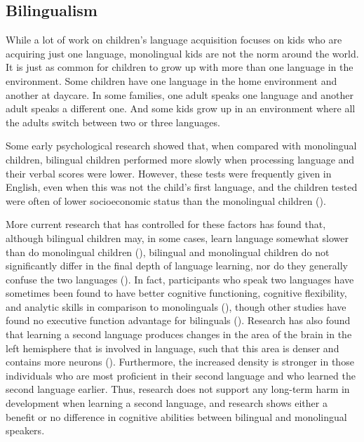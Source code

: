 \documentclass[
]{krantz}
\begin{document}
\subsection*{Bilingualism}\label{bilingualism}


While a lot of work on children's language acquisition focuses on kids who are acquiring just one language, monolingual kids are not the norm around the world. It is just as common for children to grow up with more than one language in the environment. Some children have one language in the home environment and another at daycare. In some families, one adult speaks one language and another adult speaks a different one. And some kids grow up in an environment where all the adults switch between two or three languages.

Some early psychological research showed that, when compared with monolingual children, bilingual children performed more slowly when processing language and their verbal scores were lower. However, these tests were frequently given in English, even when this was not the child's first language, and the children tested were often of lower socioeconomic status than the monolingual children ().

More current research that has controlled for these factors has found that, although bilingual children may, in some cases, learn language somewhat slower than do monolingual children (), bilingual and monolingual children do not significantly differ in the final depth of language learning, nor do they generally confuse the two languages (). In fact, participants who speak two languages have sometimes been found to have better cognitive functioning, cognitive flexibility, and analytic skills in comparison to monolinguals (), though other studies have found no executive function advantage for bilinguals (). Research has also found that learning a second language produces changes in the area of the brain in the left hemisphere that is involved in language, such that this area is denser and contains more neurons (). Furthermore, the increased density is stronger in those individuals who are most proficient in their second language and who learned the second language earlier. Thus, research does not support any long-term harm in development when learning a second language, and research shows either a benefit or no difference in cognitive abilities between bilingual and monolingual speakers.
\end{document}
